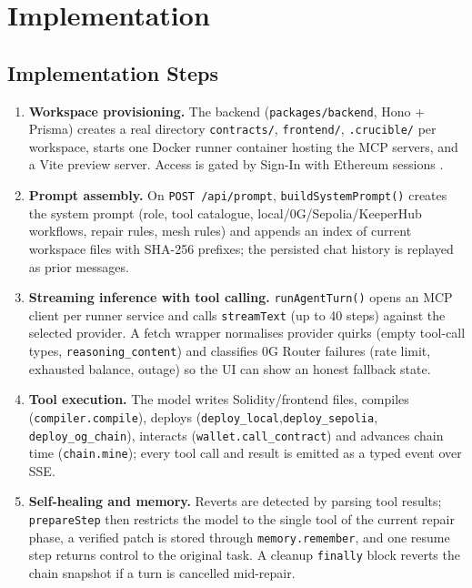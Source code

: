\documentclass[11pt,letterpaper]{article}
\begin{document}
\section{Implementation}

\subsection{Implementation Steps}
\begin{enumerate}[leftmargin=1.6em,itemsep=3pt]
  \item \textbf{Workspace provisioning.} The backend (\texttt{packages/backend}, Hono + Prisma) creates a real directory \texttt{contracts/}, \texttt{frontend/}, \texttt{.crucible/} per workspace, starts one Docker runner container hosting the MCP servers, and a Vite preview server. Access is gated by Sign-In with Ethereum sessions \cite{eip4361}.
  \item \textbf{Prompt assembly.} On \texttt{POST /api/prompt}, \texttt{buildSystemPrompt()} creates the system prompt (role, tool catalogue, local/0G/Sepolia/KeeperHub workflows, repair rules, mesh rules) and appends an index of current workspace files with SHA-256 prefixes; the persisted chat history is replayed as prior messages.
  \item \textbf{Streaming inference with tool calling.} \texttt{runAgentTurn()} opens an MCP client per runner service and calls \texttt{streamText} (up to 40 steps) against the selected provider. A fetch wrapper normalises provider quirks (empty tool-call types, \texttt{reasoning\_content}) and classifies 0G Router failures (rate limit, exhausted balance, outage) so the UI can show an honest fallback state.
  \item \textbf{Tool execution.} The model writes Solidity/frontend files, compiles (\texttt{compiler.compile}), deploys (\texttt{deploy\_local},\texttt{deploy\_sepolia}, \texttt{deploy\_og\_chain}), interacts (\texttt{wallet.call\_contract}) and advances chain time (\texttt{chain.mine}); every tool call and result is emitted as a typed event over SSE.
  \item \textbf{Self-healing and memory.} Reverts are detected by parsing tool results; \texttt{prepareStep} then restricts the model to the single tool of the current repair phase, a verified patch is stored through \texttt{memory.remember}, and one resume step returns control to the original task. A cleanup \texttt{finally} block reverts the chain snapshot if a turn is cancelled mid-repair.
\end{enumerate}
\end{document}
